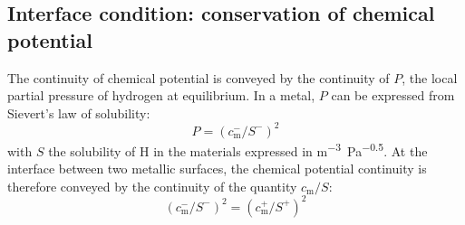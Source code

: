 \subsection{Interface condition: conservation of chemical potential}



    

The continuity of chemical potential is conveyed by the continuity of $P$, the local partial pressure of hydrogen at equilibrium.
In a metal, $P$ can be expressed from Sievert's law of solubility:
\begin{equation}
    P = (c_\mathrm{m}^-/S^-)^2
\end{equation}
with $S$ the solubility of H in the materials expressed in \si{m^{-3}.Pa^{-0.5}}.
At the interface between two metallic surfaces, the chemical potential continuity is therefore conveyed by the continuity of the quantity $c_\mathrm{m}/S$:
\begin{equation}
    (c_\mathrm{m}^-/S^-)^2 = (c_\mathrm{m}^+/S^+)^2
\end{equation}

